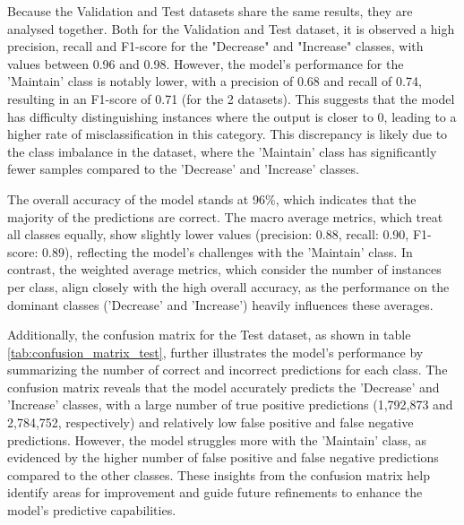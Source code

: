 Because the Validation and Test datasets share the same results, they are analysed together.
Both for the Validation and Test dataset, it is observed a high precision, recall and F1-score for the "Decrease" and "Increase" classes, with values between 0.96 and 0.98. However, the model's performance for the 'Maintain' class is notably lower, with a precision of 0.68 and recall of 0.74, resulting in an F1-score of 0.71 (for the 2 datasets). This suggests that the model has difficulty distinguishing instances where the output is closer to 0, leading to a higher rate of misclassification in this category. This discrepancy is likely due to the class imbalance in the dataset, where the 'Maintain' class has significantly fewer samples compared to the 'Decrease' and 'Increase' classes.

The overall accuracy of the model stands at 96\%, which indicates that the majority of the predictions are correct. The macro average metrics, which treat all classes equally, show slightly lower values (precision: 0.88, recall: 0.90, F1-score: 0.89), reflecting the model's challenges with the 'Maintain' class. In contrast, the weighted average metrics, which consider the number of instances per class, align closely with the high overall accuracy, as the performance on the dominant classes ('Decrease' and 'Increase') heavily influences these averages.

Additionally, the confusion matrix for the Test dataset, as shown in table \ref{tab:confusion_matrix_test}, further illustrates the model's performance by summarizing the number of correct and incorrect predictions for each class. The confusion matrix reveals that the model accurately predicts the 'Decrease' and 'Increase' classes, with a large number of true positive predictions (1,792,873 and 2,784,752, respectively) and relatively low false positive and false negative predictions. However, the model struggles more with the 'Maintain' class, as evidenced by the higher number of false positive and false negative predictions compared to the other classes. These insights from the confusion matrix help identify areas for improvement and guide future refinements to enhance the model's predictive capabilities.
